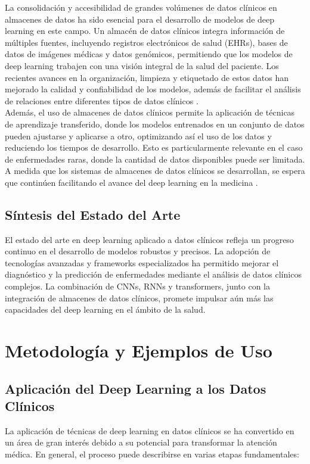 \documentclass{article}
\begin{document}
La consolidación y accesibilidad de grandes volúmenes de datos clínicos en almacenes de datos ha sido esencial para el desarrollo de modelos de deep learning en este campo. Un almacén de datos clínicos integra información de múltiples fuentes, incluyendo registros electrónicos de salud (EHRs), bases de datos de imágenes médicas y datos genómicos, permitiendo que los modelos de deep learning trabajen con una visión integral de la salud del paciente. Los recientes avances en la organización, limpieza y etiquetado de estos datos han mejorado la calidad y confiabilidad de los modelos, además de facilitar el análisis de relaciones entre diferentes tipos de datos clínicos \cite{miotto2018deep}.
\\

Además, el uso de almacenes de datos clínicos permite la aplicación de técnicas de aprendizaje transferido, donde los modelos entrenados en un conjunto de datos pueden ajustarse y aplicarse a otro, optimizando así el uso de los datos y reduciendo los tiempos de desarrollo. Esto es particularmente relevante en el caso de enfermedades raras, donde la cantidad de datos disponibles puede ser limitada. A medida que los sistemas de almacenes de datos clínicos se desarrollan, se espera que continúen facilitando el avance del deep learning en la medicina \cite{shickel2017deep}.

\subsection{Síntesis del Estado del Arte}

El estado del arte en deep learning aplicado a datos clínicos refleja un progreso continuo en el desarrollo de modelos robustos y precisos. La adopción de tecnologías avanzadas y frameworks especializados ha permitido mejorar el diagnóstico y la predicción de enfermedades mediante el análisis de datos clínicos complejos. La combinación de CNNs, RNNs y transformers, junto con la integración de almacenes de datos clínicos, promete impulsar aún más las capacidades del deep learning en el ámbito de la salud.
\\

\section{Metodología y Ejemplos de Uso}
\label{sec:metodologia_ejemplos}

\subsection{Aplicación del Deep Learning a los Datos Clínicos}
La aplicación de técnicas de deep learning en datos clínicos se ha convertido en un área de gran interés debido a su potencial para transformar la atención médica. En general, el proceso puede describirse en varias etapas fundamentales:
\end{document}
